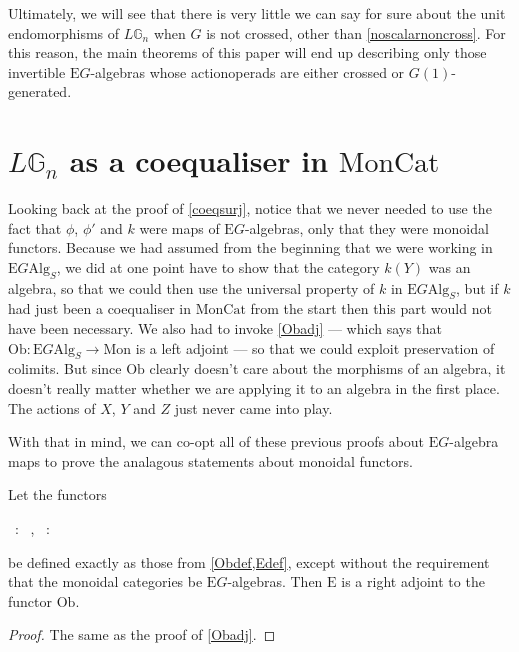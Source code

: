 Ultimately, we will see that there is very little we can say for sure about the unit endomorphisms of $L\mathbb{G}_n$ when $G$ is not crossed, other than \cref{noscalarnoncross}. For this reason, the main theorems of this paper will end up describing only those invertible $\mathrm{E}G$-algebras whose actionoperads are either crossed or $G(1)$-generated.


\section{$L\mathbb{G}_n$ as a coequaliser in $\mathrm{MonCat}$} \label{colimmoncat}

Looking back at the proof of \cref{coeqsurj}, notice that we never needed to use the fact that $\phi$, $\phi'$ and $k$ were maps of $\mathrm{E}G$-algebras, only that they were monoidal functors. Because we had assumed from the beginning that we were working in $\mathrm{E}G\mathrm{Alg}_S$, we did at one point have to show that the category $k(Y)$ was an algebra, so that we could then use the universal property of $k$ in $\mathrm{E}G\mathrm{Alg}_S$, but if $k$ had just been a coequaliser in $\mathrm{MonCat}$ from the start then this part would not have been necessary. We also had to invoke \cref{Obadj} --- which says that $\mathrm{Ob}: \mathrm{E}G\mathrm{Alg}_S \to \mathrm{Mon}$ is a left adjoint --- so that we could exploit preservation of colimits. But since $\mathrm{Ob}$ clearly doesn't care about the morphisms of an algebra, it doesn't really matter whether we are applying it to an algebra in the first place. The actions of $X$, $Y$ and $Z$ just never came into play.

With that in mind, we can co-opt all of these previous proofs about $\mathrm{E}G$-algebra maps to prove the analagous statements about monoidal functors.

\begin{prop}\label{Obadjmon} Let the functors 
\begin{eq*}  \, : \,  \to {}, \quad \quad \quad {} \, : \,  \to {} \end{eq*}
be defined exactly as those from \cref{Obdef,Edef}, except without the requirement that the monoidal categories be $\mathrm{E}G$-algebras. Then $\mathrm{E}$ is a right adjoint to the functor $\mathrm{Ob}$. 
\end{prop}
\begin{proof}
The same as the proof of \cref{Obadj}.
\end{proof}

